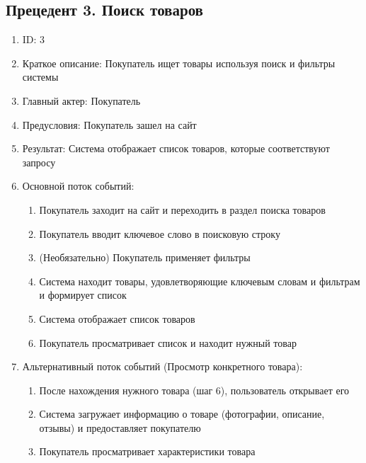 \documentclass{article}
\begin{document}
\subsection{Прецедент 3. Поиск товаров}
\begin{enumerate}
    \item ID: 3
    \item Краткое описание: Покупатель ищет товары используя поиск и фильтры системы
    \item Главный актер: Покупатель
    \item Предусловия: Покупатель зашел на сайт
    \item Результат: Система отображает список товаров, которые соответствуют запросу
    \item Основной поток событий:
    \begin{enumerate}
        \item Покупатель заходит на сайт и переходить в раздел поиска товаров
        \item Покупатель вводит ключевое слово в поисковую строку
        \item (Необязательно) Покупатель применяет фильтры 
        \item Система находит товары, удовлетворяющие ключевым словам и фильтрам и формирует список
        \item Система отображает список товаров
        \item Покупатель просматривает список и находит нужный товар
    \end{enumerate}
    \item Альтернативный поток событий (Просмотр конкретного товара):
    \begin{enumerate}
            \item После нахождения нужного товара (шаг 6), пользователь открывает его
            \item Система загружает информацию о товаре (фотографии, описание, отзывы) и предоставляет покупателю
            \item Покупатель просматривает характеристики товара
    \end{enumerate}
\end{enumerate}
\end{document}
